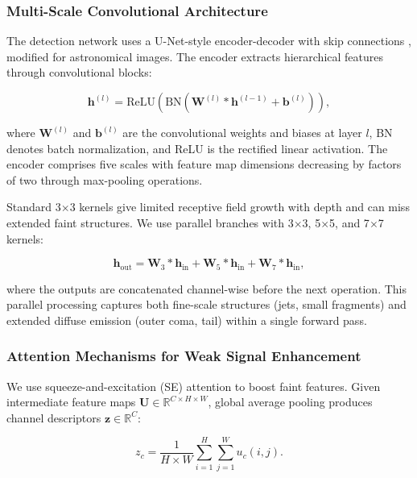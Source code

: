 \documentclass[preprint2]{aastex631}
\begin{document}
\subsubsection{Multi-Scale Convolutional Architecture}

The detection network uses a U-Net-style encoder-decoder with skip connections \citep{ronneberger15}, modified for astronomical images. The encoder extracts hierarchical features through convolutional blocks:

\begin{equation}\label{eq:conv_block}
\mathbf{h}^{(l)} = \text{ReLU}\left(\text{BN}\left(\mathbf{W}^{(l)} * \mathbf{h}^{(l-1)} + \mathbf{b}^{(l)}\right)\right),
\end{equation}

where $\mathbf{W}^{(l)}$ and $\mathbf{b}^{(l)}$ are the convolutional weights and biases at layer $l$, BN denotes batch normalization, and ReLU is the rectified linear activation. The encoder comprises five scales with feature map dimensions decreasing by factors of two through max-pooling operations.

Standard 3$\times$3 kernels give limited receptive field growth with depth and can miss extended faint structures. We use parallel branches with 3$\times$3, 5$\times$5, and 7$\times$7 kernels:

\begin{equation}\label{eq:multi_kernel}
\mathbf{h}_{\text{out}} = \mathbf{W}_3 * \mathbf{h}_{\text{in}} + \mathbf{W}_5 * \mathbf{h}_{\text{in}} + \mathbf{W}_7 * \mathbf{h}_{\text{in}},
\end{equation}

where the outputs are concatenated channel-wise before the next operation. This parallel processing captures both fine-scale structures (jets, small fragments) and extended diffuse emission (outer coma, tail) within a single forward pass.

\subsubsection{Attention Mechanisms for Weak Signal Enhancement}

We use squeeze-and-excitation (SE) attention \citep{hu18} to boost faint features. Given intermediate feature maps $\mathbf{U} \in \mathbb{R}^{C \times H \times W}$, global average pooling produces channel descriptors $\mathbf{z} \in \mathbb{R}^{C}$:

\begin{equation}\label{eq:se_squeeze}
z_c = \frac{1}{H \times W} \sum_{i=1}^{H} \sum_{j=1}^{W} u_c(i, j).
\end{equation}
\end{document}
